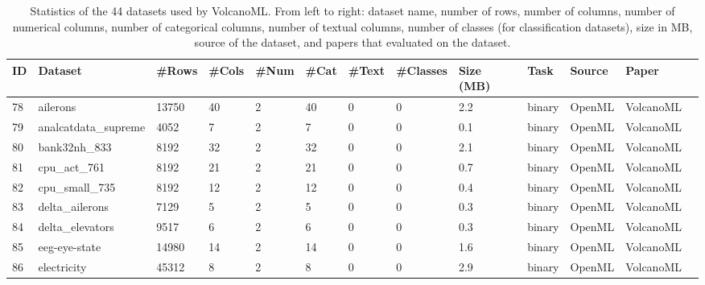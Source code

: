 \begin{table*}%
\scriptsize
\centering
\caption{Statistics of the 44 datasets used by VolcanoML. From left to right: dataset name, number of rows, number of columns, number of numerical columns, number of categorical columns, number of textual columns, number of classes (for classification datasets), size in MB, source of the dataset, and papers that evaluated on the dataset.}
\begin{tabular}{lllllllllllll}
\toprule
\textbf{ID} & \textbf{Dataset} & \textbf{\#Rows} & \textbf{\#Cols} & \textbf{\#Num} & \textbf{\#Cat} & \textbf{\#Text} & \textbf{\#Classes}  & \textbf{Size (MB)} & \textbf{Task} & \textbf{Source} & \textbf{Paper} \\
\midrule

78  & ailerons                                    & 13750   & 40     & 2     & 40    & 0      & 0         & 2.2       & binary      & OpenML & VolcanoML        \\
79  & analcatdata\_supreme                        & 4052    & 7      & 2     & 7     & 0      & 0         & 0.1       & binary      & OpenML & VolcanoML        \\
80  & bank32nh\_833                               & 8192    & 32     & 2     & 32    & 0      & 0         & 2.1       & binary      & OpenML & VolcanoML        \\
81  & cpu\_act\_761                               & 8192    & 21     & 2     & 21    & 0      & 0         & 0.7       & binary      & OpenML & VolcanoML        \\
82  & cpu\_small\_735                             & 8192    & 12     & 2     & 12    & 0      & 0         & 0.4       & binary      & OpenML & VolcanoML        \\
83  & delta\_ailerons                             & 7129    & 5      & 2     & 5     & 0      & 0         & 0.3       & binary      & OpenML & VolcanoML        \\
84  & delta\_elevators                            & 9517    & 6      & 2     & 6     & 0      & 0         & 0.3       & binary      & OpenML & VolcanoML        \\
85  & eeg-eye-state                               & 14980   & 14     & 2     & 14    & 0      & 0         & 1.6       & binary      & OpenML & VolcanoML        \\
86  & electricity                                 & 45312   & 8      & 2     & 8     & 0      & 0         & 2.9       & binary      & OpenML & VolcanoML        \\

\end{tabular}
\end{table*}
